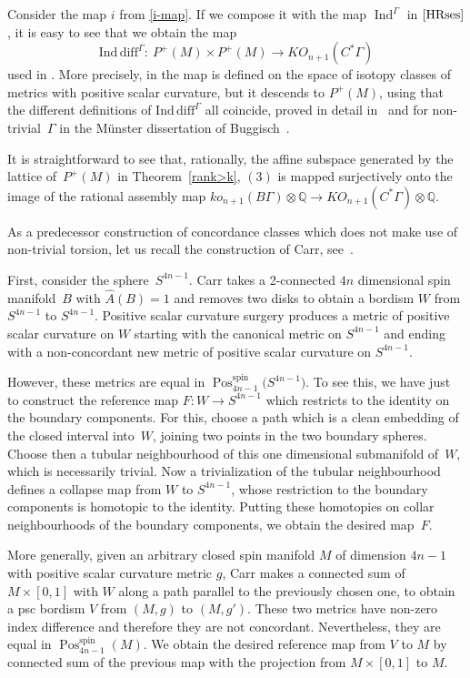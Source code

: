 \documentclass[pdftex]{sigma}
\numberwithin{equation}{section}
\def\QQ{\ensuremath{\mathbb{Q}}}
\DeclareMathOperator{\Ind}{Ind}
\DeclareMathOperator{\Pos}{Pos}
\DeclareMathOperator{\spin}{spin}
\begin{document}
\begin{Remark}Consider the map $i$ from \eqref{i-map}. If we compose it
 with the map ${\Ind}^{\Gamma}$ in $\eqref{HRses}$, it is easy to see
 that we obtain the map \[\mathrm{Ind\, diff}^\Gamma\colon \ P^+(M)\times
 P^+(M)\to KO_{n+1}(C^*\Gamma)\] used in \cite[Section~5.3]{EbertRW}. More
 precisely, in \cite{EbertRW} the map is defined on the space of isotopy
 classes of metrics with positive scalar curvature, but it descends to
 $P^+(M)$, using that the different definitions of $\mathrm{Ind\,diff}^\Gamma$ all
 coincide, proved in detail in~\cite{Ebert_inddiff} and for non-trivial~$\Gamma$ in the M\"unster dissertation of Buggisch~\cite{Buggisch}.

 It is straightforward to see that, rationally, the affine subspace generated by the lattice of~$P^+(M)$ in Theorem~\ref{rank>k}, $(3)$ is mapped surjectively onto
 the image of the rational assembly map $ko_{n+1}(B\Gamma)\otimes\QQ\to KO_{n+1}(C^*\Gamma)\otimes\QQ$.
\end{Remark}

\begin{Remark}\label{carr}
 As a predecessor construction of concordance classes which does not make use of non-trivial torsion, let us recall the construction of Carr, see~\cite{Carr}.

 First, consider the sphere~$S^{4n-1}$. Carr takes a 2-connected $4n$ dimensional spin manifold~$B$ with $\hat{A}(B)=1$ and removes two disks to obtain a bordism $W$ from $S^{4n-1}$ to $S^{4n-1}$. Positive scalar curvature surgery produces a metric of positive scalar curvature on $W$ starting with the canonical metric on $S^{4n-1}$ and ending with a non-concordant new metric of positive scalar curvature on $S^{4n-1}$.

 However, these metrics are equal in $\Pos^{\spin}_{4n-1}\big(S^{4n-1}\big)$. To see this, we have just to construct the reference map $F\colon W\to S^{4n-1}$ which restricts to the identity on the boundary components.
 For this, choose a path which is a clean embedding of the closed interval into~$W$, joining two points in the two boundary spheres. Choose then a tubular neighbourhood of this one dimensional submanifold of~$W$, which is necessarily trivial. Now a trivialization of the tubular neighbourhood defines a collapse map from $W$ to $S^{4n-1}$, whose restriction to the boundary components is homotopic to the identity. Putting these homotopies on collar neighbourhoods of the boundary components, we obtain the desired map~$F$.

 More generally, given an arbitrary closed spin manifold $M$ of dimension $4n-1$ with positive scalar curvature metric $g$, Carr makes a connected sum of $M\times [0,1]$ with $W$ along a path parallel to the previously chosen one, to obtain a psc bordism $V$ from $(M,g)$ to $(M,g')$. These two metrics have non-zero index difference and therefore they are not concordant.
 Nevertheless, they are equal in $\Pos^{\spin}_{4n-1}(M)$. We obtain the desired reference map from $V $ to $M$ by connected sum of the previous map with the projection from $M\times [0,1]$ to $M$.
\end{Remark}
\end{document}
